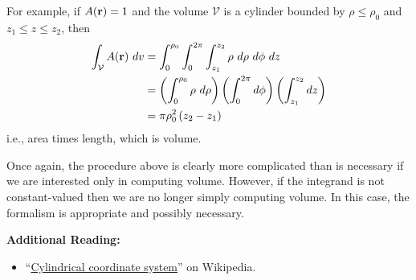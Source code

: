 For example, if $A({\bf r})=1$ and the volume $\mathcal{V}$ is a cylinder bounded by $\rho\le \rho_0$ and $z_1\le z \le z_2$, then 
%
\begin{equation}
\begin{split}
\int_{\mathcal V} A({\bf r})~dv  &= \int_{0}^{\rho_0} \int_{0}^{2\pi} \int_{z_1}^{z_2} \rho~d\rho~d\phi~dz \\
                                 &= \left(\int_{0}^{\rho_0} \rho~d\rho \right)  \left( \int_{0}^{2\pi} d\phi \right)  \left( \int_{z_1}^{z_2} dz\right) \\
                                 & = \pi \rho_0^2 \left(z_2-z_1\right) 
\end{split}
\end{equation} 
%
i.e., area times length, which is volume.

Once again, the procedure above is clearly more complicated than is necessary if we are interested only in computing volume.
However, if the integrand is not constant-valued then we are no longer simply computing volume.
In this case, the formalism is appropriate and possibly necessary.  


{\bf Additional Reading:}
\begin{itemize}
\item ``\href{https://en.wikipedia.org/wiki/Cylindrical_coordinate_system}{Cylindrical coordinate system}'' on Wikipedia.
\end{itemize}

